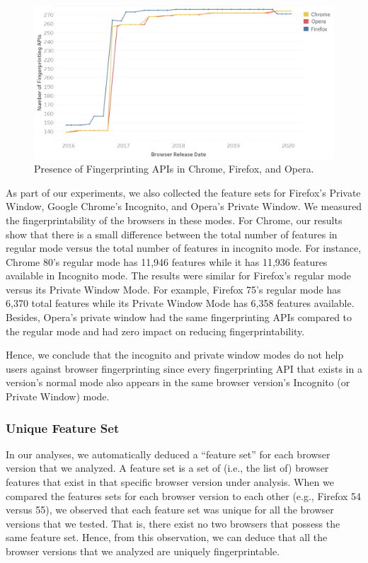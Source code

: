 \begin{figure}[ht]
    \centering
    \includegraphics[width=\columnwidth]{figures/Fingerprinting-APIs.png}
    \caption{Presence of Fingerprinting APIs in Chrome, Firefox, and Opera.}
    \label{fig:fingerprint-apis}
\end{figure}

As part of our experiments, we also collected the feature sets for Firefox's Private Window,
Google Chrome's Incognito, and Opera's Private Window. We measured the
fingerprintability of the browsers in these modes. For Chrome, our results show
that there is a small difference between the total number of features in regular
mode versus the total number of features in incognito mode. For instance,
Chrome 80's regular mode has 11,946 features while it has 11,936 features
available in Incognito mode. The results were similar for Firefox's regular mode
versus its Private Window Mode. For example, Firefox 75's regular mode has 6,370
total features while its Private Window Mode has 6,358 features available. Besides,
Opera's private window had the same fingerprinting APIs compared to the regular mode
and had zero impact on reducing fingerprintability.

Hence, we conclude that the incognito and private window modes do not help
users against browser fingerprinting since every fingerprinting API that exists
in a version's normal mode also appears in the same browser version's Incognito
(or Private Window) mode.

\subsubsection{Unique Feature Set}

In our analyses, we automatically deduced a ``feature set'' for each
browser version that we analyzed. A feature set is a set of (i.e., the
list of) browser features that exist in that specific browser version
under analysis. When we compared the features sets for each browser
version to each other (e.g., Firefox 54 versus 55), we observed that
each feature set was unique for all the browser versions that we
tested. That is, there exist no two browsers that possess the same
feature set. Hence, from this observation, we can deduce that all the
browser versions that we analyzed are uniquely fingerprintable.

